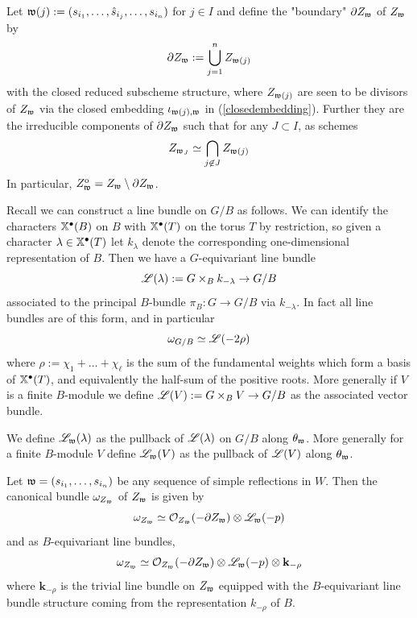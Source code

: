\documentclass[12pt]{article}
\begin{document}
Let $\mathfrak{w}(j) := (s_{i_1}, \ldots, \hat{s}_{i_j}, \ldots, s_{i_n})$ for $j \in I$ and define the "boundary" $\partial Z_{\mathfrak{w}}$ of $Z_{\mathfrak{w}}$ by
\[\partial Z_{\mathfrak{w}} := \bigcup_{j=1}^n Z_{\mathfrak{w}(j)}\]
with the closed reduced subscheme structure, where $Z_{\mathfrak{w}(j)}$ are seen to be divisors of $Z_{\mathfrak{w}}$ via the closed embedding $\iota_{\mathfrak{w}(j), \mathfrak{w}}$ in (\ref{closedembedding}). Further they are the irreducible components of $\partial Z_{\mathfrak{w}}$ such that for any $J \subset I$, as schemes
\[Z_{\mathfrak{w}_J} \simeq \bigcap_{j \not \in J} Z_{\mathfrak{w}(j)}\]
In particular, $Z^{\mathrm{o}}_{\mathfrak{w}} = Z_{\mathfrak{w}} \setminus \partial Z_{\mathfrak{w}}$.

Recall we can construct a line bundle on $G/B$ as follows. We can identify the characters $\mathbb{X}^{\bullet}(B)$ on $B$ with $\mathbb{X}^{\bullet}(T)$ on the torus $T$ by restriction, so given a character $\lambda \in \mathbb{X}^{\bullet}(T)$ let $k_{\lambda}$ denote the corresponding one-dimensional representation of $B$. Then we have a $G$-equivariant line bundle
\[\mathscr{L}(\lambda) := G \times_B k_{-\lambda} \rightarrow G/B\]
associated to the principal $B$-bundle $\pi_B \colon G \to G/B$ via $k_{-\lambda}$. In fact all line bundles are of this form, and in particular 
\[\omega_{G/B} \simeq \mathscr{L}(-2\rho)\]
where $\rho := \chi_1 + \ldots + \chi_{\ell}$ is the sum of the fundamental weights which form a basis of $\mathbb{X}^{\bullet}(T)$, and equivalently the half-sum of the positive roots. More generally if $V$ is a finite $B$-module we define $\mathscr{L}(V) := G \times_B V \to G/B$ as the associated vector bundle.

We define $\mathscr{L}_{\mathfrak{w}}(\lambda)$ as the pullback of $\mathscr{L}(\lambda)$ on $G/B$ along $\theta_{\mathfrak{w}}$. More generally for a finite $B$-module $V$ define $\mathscr{L}_{\mathfrak{w}}(V)$ as the pullback of $\mathscr{L}(V)$ along $\theta_{\mathfrak{w}}$.

\begin{prop}
    Let $\mathfrak{w} = (s_{i_1}, \ldots, s_{i_n})$ be any sequence of simple reflections in $W$. Then the canonical bundle $\omega_{Z_{\mathfrak{w}}}$ of $Z_{\mathfrak{w}}$ is given by 
    \begin{equation}\label{eq1}
        \omega_{Z_{\mathfrak{w}}} \simeq \mathcal{O}_{Z_{\mathfrak{w}}}(-\partial Z_{\mathfrak{w}}) \otimes \mathscr{L}_{\mathfrak{w}}(-p)
    \end{equation}
    and as $B$-equivariant line bundles,
    \begin{equation}\label{eq2}
        \omega_{Z_{\mathfrak{w}}} \simeq \mathcal{O}_{Z_{\mathfrak{w}}}(-\partial Z_{\mathfrak{w}}) \otimes \mathscr{L}_{\mathfrak{w}}(-p) \otimes \mathbf{k}_{-\rho}
    \end{equation}
    where $\mathbf{k}_{-\rho}$ is the trivial line bundle on $Z_{\mathfrak{w}}$ equipped with the $B$-equivariant line bundle structure coming from the representation $k_{-\rho}$ of $B$.
\end{prop}
\end{document}
